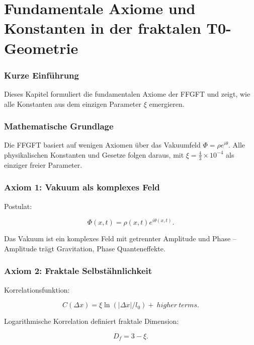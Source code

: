 \chapter{Fundamentale Axiome und Konstanten in der fraktalen T0-Geometrie}


	
	\subsection*{Kurze Einführung}
	
	Dieses Kapitel formuliert die fundamentalen Axiome der FFGFT und zeigt, wie alle Konstanten aus dem einzigen Parameter \(\xi\) emergieren.
	
	\subsection*{Mathematische Grundlage}
	
	Die FFGFT basiert auf wenigen Axiomen über das Vakuumfeld \(\Phi = \rho e^{i\theta}\). Alle physikalischen Konstanten und Gesetze folgen daraus, mit \(\xi = \frac{4}{3} \times 10^{-4}\) als einziger freier Parameter.

	
	\subsection*{Axiom 1: Vakuum als komplexes Feld}
	
	Postulat:
	
	\begin{equation}
		\Phi(x,t) = \rho(x,t) e^{i \theta(x,t)}.
	\end{equation}
	
	Das Vakuum ist ein komplexes Feld mit getrennter Amplitude und Phase – Amplitude trägt Gravitation, Phase Quanteneffekte.
	
	\subsection*{Axiom 2: Fraktale Selbstähnlichkeit}
	
	Korrelationsfunktion:
	
	\begin{equation}
		C(\Delta x) = \xi \ln(|\Delta x|/l_0) + \ higher\ terms.
	\end{equation}
	
	Logarithmische Korrelation definiert fraktale Dimension:
	
	\begin{equation}
		D_f = 3 - \xi.
	\end{equation}
	
